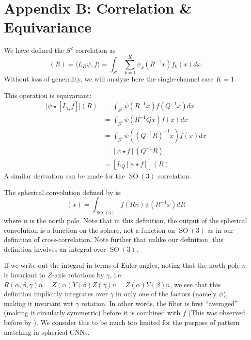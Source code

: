 \documentclass{article} %
\newcommand{\SO}[1]{\ensuremath{\operatorname{SO}(#1)}}
\begin{document}
\section*{Appendix B: Correlation \& Equivariance}

We have defined the $S^2$ correlation as
\begin{equation}
  [\psi \star f](R) = \langle L_R \psi, f \rangle = \int_{S^2} \sum_{k=1}^K \psi_k(R^{-1} x) f_k(x) dx.
\end{equation}
Without loss of generality, we will analyze here the single-channel case $K=1$.

This operation is equivariant:
\begin{equation}
  \begin{aligned}
    \lbrack \psi \star [L_{Q} f]](R)
      &=
    \int_{S^2} \psi(R^{-1} x) f(Q^{-1} x) dx \\
    &=
    \int_{S^2} \psi(R^{-1} Q x) f(x) dx \\
    &=
    \int_{S^2} \psi((Q^{-1} R)^{-1} x) f(x) dx \\
    &=
    [\psi \star f](Q^{-1} R) \\
    &=
    [L_{Q}[\psi \star f]](R)
  \end{aligned}
\end{equation}
A similar derivation can be made for the $\SO3$ correlation.

The spherical convolution defined by \cite{Driscoll1994} is:
\begin{equation}
  [f * \psi](x) = \int_{\SO3} f(R n) \psi(R^{-1} x) dR
\end{equation}
where $n$ is the north pole.
Note that in this definition, the output of the spherical convolution is a function on the sphere, not a function on $\SO3$ as in our definition of cross-correlation.
Note further that unlike our definition, this definition involves an integral over $\SO3$.

If we write out the integral in terms of Euler angles, noting that the north-pole $n$ is invariant to $Z$-axis rotations by $\gamma$, i.e. $R(\alpha, \beta, \gamma)n = Z(\alpha) Y(\beta) Z(\gamma) n = Z(\alpha) Y(\beta) n$, we see that this definition implicitly integrates over $\gamma$ in only one of the factors (namely $\psi$), making it invariant wrt $\gamma$ rotation.
In other words, the filter is first ``averaged'' (making it circularly symmetric) before it is combined with $f$ (This was observed before by \cite{Makadia2007-fv}).
We consider this to be much too limited for the purpose of pattern matching in spherical CNNs.
\end{document}
